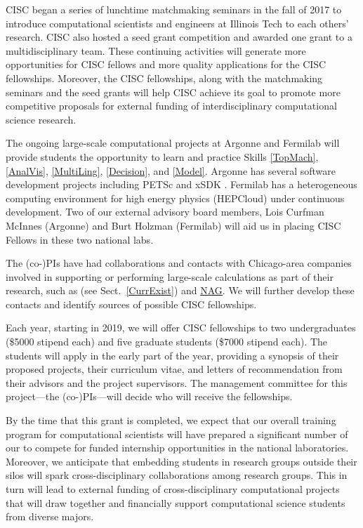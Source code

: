 \documentclass[11pt]{NSFamsart}
\begin{document}
CISC began a series of lunchtime matchmaking seminars in the fall of 2017 to introduce computational scientists and engineers at Illinois Tech to each others' research.  CISC also hosted a seed grant competition and awarded one grant to a multidisciplinary team.  These continuing activities will generate more opportunities for CISC fellows and more quality applications for the CISC fellowships.  Moreover, the CISC fellowships, along with the matchmaking seminars and the seed grants will help CISC achieve its goal to promote more competitive proposals for external funding of interdisciplinary computational science research. 

The ongoing large-scale computational projects at Argonne and Fermilab will provide students the opportunity to learn and practice Skills \ref{TopMach}, \ref{AnalVis}, \ref{MultiLing}, \ref{Decision}, and \ref{Model}.  Argonne has several software development projects including PETSc \cite{petsc-web-page17} and xSDK \cite{XSDK17a}. Fermilab has a heterogeneous computing environment for high energy physics (HEPCloud) \cite{HEP18a} under continuous development.  Two of our external advisory board members, Lois Curfman McInnes (Argonne) and Burt Holzman (Fermilab) will aid us in placing CISC Fellows in these two national labs.

The (co-)PIs have had collaborations and contacts with Chicago-area companies involved in supporting or performing large-scale calculations as part of their research, such as \HAVI (see Sect.~\ref{CurrExist}) and \href{https://www.nag.com}{NAG}.  We will further develop these contacts and identify sources of possible CISC fellowships.

Each year, starting in 2019, we will offer CISC fellowships to two undergraduates (\$5000 stipend each) and five graduate students (\$7000 stipend each).  The students will apply in the early part of the year, providing a synopsis of their proposed projects, their curriculum vitae, and letters of recommendation from their advisors and the project supervisors.  The management committee for this project---the (co-)PIs---will decide who will receive the fellowships.  

By the time that this grant is completed, we expect that our overall training program for computational scientists will have prepared a significant number of our to compete for funded internship opportunities in the national laboratories.  Moreover, we anticipate that embedding  students in research groups outside their silos will spark cross-disciplinary collaborations among research groups.  This in turn will lead to external funding of cross-disciplinary computational projects that will draw together and financially support computational science students from diverse majors.
\end{document}
